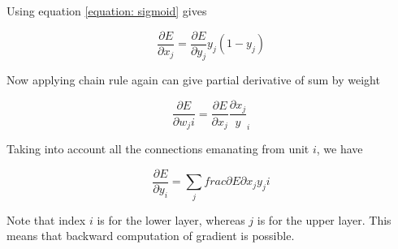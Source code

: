 \documentclass{article}
\begin{document}
Using equation \ref{equation: sigmoid} gives

\begin{equation}
    \frac{\partial E}{\partial x_j} = \frac{\partial E}{\partial y_j} y_j(1-y_j) 
    \label{equation: chain sigmoid}
\end{equation}

Now applying chain rule again can give partial derivative of sum by weight

\begin{equation}
    \frac{\partial E}{\partial w_ji} = \frac{\partial E}{\partial x_j} \frac{\partial x_j}y_i
    \label{equation: weight error}
\end{equation}

Taking into account all the connections emanating from unit $i$, we have 

\begin{equation}
    \frac{\partial E}{\partial y_i} = \sum_{j}^{} {frac{\partial E}{\partial x_j} y_ji}
    \label{equation: weight error}
\end{equation}

Note that index $i$ is for the lower layer, whereas $j$ is for the upper layer.
This means that backward computation of gradient is possible.
\end{document}
